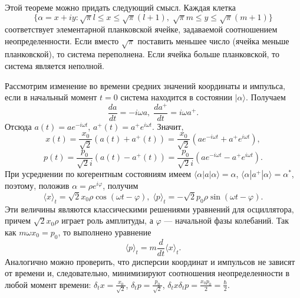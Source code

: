 \documentclass[a4paper
]{article}
\begin{document}
Этой теореме можно придать следующий смысл. Каждая клетка $$\{\alpha=x+iy:
\sqrt{\pi}l\le x\le \sqrt{\pi}(l+1), \; \sqrt{\pi}m\le y\le \sqrt{\pi}(m+1)\}$$
соответствует элементарной планковской ячейке, задаваемой соотношением
неопределенности. Если вместо $\sqrt{\pi}$ поставить меньшее число
(ячейка меньше планковской), то система переполнена. Если ячейка
больше планковской, то система является неполной. \par
Рассмотрим изменение во времени средних значений координаты и импульса,
если в начальный момент $t=0$ система находится в состоянии $|\alpha
\rangle$. Получаем $$\frac{da}{dt}=-i\omega a, \; \frac{da^+}{dt}=i\omega
a^+.$$ Отсюда $a(t)= ae^{-i\omega t}$, $a^+(t)=a^+e^{i\omega t}$.
Значит, $$x(t)=\frac{x_0}{\sqrt{2}}(a(t)+a^+(t))=\frac{x_0}{\sqrt{2}}
(ae^{-i\omega t}+a^+e^{i\omega t}),$$ $$p(t)=\frac{p_0}{\sqrt{2}i}(a(t)-
a^+(t))=\frac{p_0}{\sqrt{2}i}(ae^{-i\omega t}-a^+e^{i\omega t}).$$
При усреднении по когерентным состояниям имеем $\langle \alpha|a|\alpha
\rangle=\alpha$, $\langle \alpha|a^+|\alpha\rangle=\alpha^*$, поэтому, положив
$\alpha=\rho e^{i\varphi}$, получим $$\langle x\rangle_t=\sqrt{2}x_0\rho
\cos (\omega t-\varphi), \; \langle p\rangle_t=-\sqrt{2}p_0\rho
\sin (\omega t-\varphi).$$ Эти величины являются классическими решениями
уравнений для осциллятора, причем $\sqrt{2}x_0\rho$ играет роль
амплитуды, а $\varphi$ --- начальной фазы колебаний. Так как $m\omega x_0=p_0$,
то выполнено уравнение $$\langle p\rangle_t=m\frac{d}{dt}\langle
x\rangle_t.$$ Аналогично можно проверить, что дисперсии координат и
импульсов не зависят от времени и, следовательно, минимизируют соотношения
неопределенности в любой момент времени: $\delta_t x=\frac{x_0}{\sqrt{2}}$,
$\delta_t p=\frac{p_0}{\sqrt{2}}$, $\delta_t x\delta_t p=\frac{x_0p_0}{2}
=\frac{\hbar}{2}$.
\end{document}
